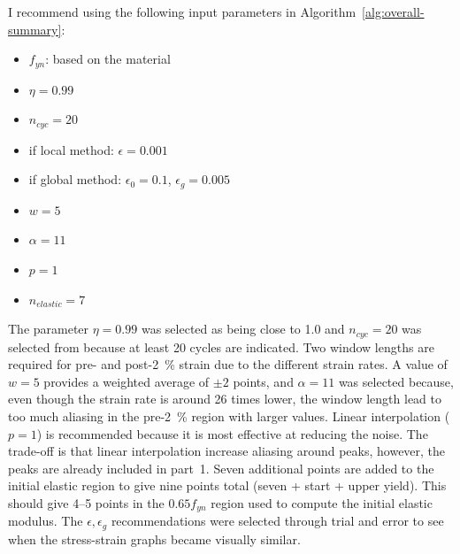 \documentclass[a4paper,11pt]{article}
\begin{document}
I recommend using the following input parameters in Algorithm~\ref{alg:overall-summary}:
\begin{itemize}
    \item $f_{yn}$: based on the material
    \item $\eta = 0.99$
    \item $n_{cyc} = 20$
    \item if local method: $\epsilon = 0.001$
    \item if global method: $\epsilon_0 = 0.1$, $\epsilon_g = 0.005$
    \item $w = 5$
    \item $\alpha = 11$
    \item $p = 1$
    \item $n_{elastic} = 7$
\end{itemize}
The parameter $\eta = 0.99$ was selected as being close to 1.0 and $n_{cyc} = 20$ was selected from \citet{deCastroeSousaConsistencySolvingInverse2020} because at least 20 cycles are indicated.
Two window lengths are required for pre- and post-2~\% strain due to the different strain rates.
A value of $w = 5$ provides a weighted average of $\pm2$ points, and $\alpha = 11$ was selected because, even though the strain rate is around 26 times lower, the window length lead to too much aliasing in the pre-2~\% region with larger values.
Linear interpolation ($p = 1$) is recommended because it is most effective at reducing the noise.
The trade-off is that linear interpolation increase aliasing around peaks, however, the peaks are already included in part~1.
Seven additional points are added to the initial elastic region to give nine points total (seven + start + upper yield).
This should give 4--5 points in the $0.65 f_{yn}$ region used to compute the initial elastic modulus.
The $\epsilon, \epsilon_g$ recommendations were selected through trial and error to see when the stress-strain graphs became visually similar.
\end{document}
